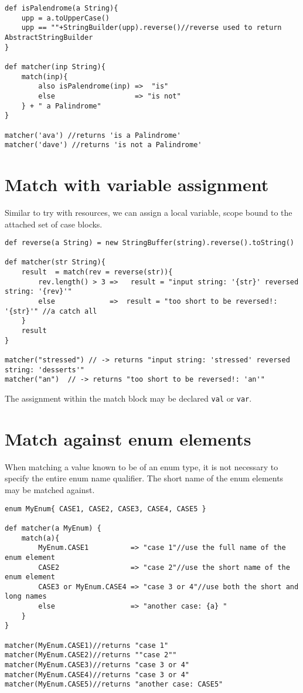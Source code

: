 \documentclass[conc-doc]{subfiles}
\begin{document}
\begin{lstlisting}
def isPalendrome(a String){
	upp = a.toUpperCase()
	upp == ""+StringBuilder(upp).reverse()//reverse used to return AbstractStringBuilder
}
	
def matcher(inp String){
	match(inp){
		also isPalendrome(inp) =>  "is" 
		else                   => "is not" 
	} + " a Palindrome"
}

matcher('ava') //returns 'is a Palindrome'
matcher('dave') //returns 'is not a Palindrome'
\end{lstlisting}

\section{Match with variable assignment}
Similar to try with resources, we can assign a local variable, scope bound to the attached set of case blocks.

\begin{lstlisting}
def reverse(a String) = new StringBuffer(string).reverse().toString()

def matcher(str String){
	result  = match(rev = reverse(str)){
		rev.length() > 3 =>   result = "input string: '{str}' reversed string: '{rev}'" 
		else             =>  result = "too short to be reversed!: '{str}'" //a catch all
	}
	result
}

matcher("stressed") // -> returns "input string: 'stressed' reversed string: 'desserts'"
matcher("an")  // -> returns "too short to be reversed!: 'an'"
\end{lstlisting}

The assignment within the match block may be declared \lstinline{val} or \lstinline{var}.

\section{Match against enum elements}
When matching a value known to be of an enum type, it is not necessary to specify the entire enum name qualifier. The short name of the enum elements may be matched against.

\begin{lstlisting}
enum MyEnum{ CASE1, CASE2, CASE3, CASE4, CASE5 }

def matcher(a MyEnum) {
	match(a){
		MyEnum.CASE1          => "case 1"//use the full name of the enum element
		CASE2                 => "case 2"//use the short name of the enum element
		CASE3 or MyEnum.CASE4 => "case 3 or 4"//use both the short and long names
		else                  => "another case: {a} " 
	}
}

matcher(MyEnum.CASE1)//returns "case 1"
matcher(MyEnum.CASE2)//returns ""case 2""
matcher(MyEnum.CASE3)//returns "case 3 or 4"
matcher(MyEnum.CASE4)//returns "case 3 or 4"
matcher(MyEnum.CASE5)//returns "another case: CASE5"
\end{lstlisting}
\end{document}
